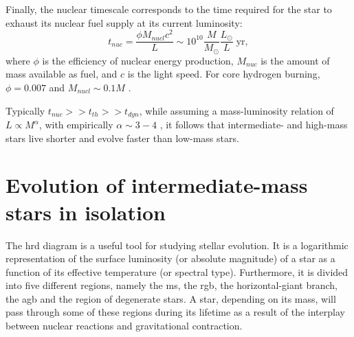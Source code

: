 Finally, the nuclear timescale corresponds to the time required for the star to exhaust its nuclear fuel supply at its current luminosity: 
\begin{equation}\label{eq:nuclear_timsecale}
    t_{nuc} = \frac{\phi M_{nucl} c^2}{L} \sim 10^{10} \frac{M}{M_{\odot}} \frac{L_{\odot}}{L} \; \text{yr},
\end{equation}
where $\phi$ is the efficiency of nuclear energy production, $M_{nuc}$ is the amount of mass available as fuel, and $c$ is the light speed. For core hydrogen burning, $\phi = 0.007$ and $M_{nucl} \sim 0.1 M$ \citep{pols2011stellar}.

Typically $t_{nuc} >> t_{th} >> t_{dyn}$, while assuming a mass-luminosity relation of $L \propto M^{\alpha}$, with empirically $\alpha \sim 3-4$ \citep{eker2015main}, it follows that intermediate- and high-mass stars live shorter and evolve faster than low-mass stars.


\section{Evolution of intermediate-mass stars in isolation}\label{sec:single_star_evolution}

The \ac{hrd} diagram is a useful tool for studying stellar evolution. It is a logarithmic representation of the surface luminosity (or absolute magnitude) of a star as a function of its effective temperature (or spectral type). Furthermore, it is divided into five different regions, namely the \ac{ms}, the \ac{rgb}, the horizontal-giant branch, the \ac{agb} and the region of degenerate stars. A star, depending on its mass, will pass through some of these regions during its lifetime as a result of the interplay between nuclear reactions and gravitational contraction. 

